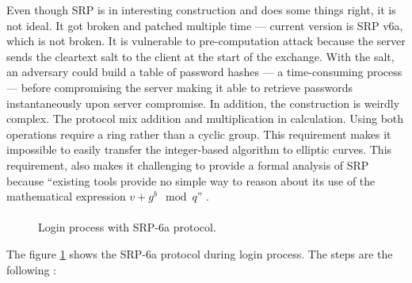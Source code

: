 ﻿\documentclass[../report.tex]{subfiles}
\begin{document}
Even though SRP is in interesting construction and does some things right, it is not ideal.
It got broken and patched multiple time --- current version is SRP v6a, which is not broken.
It is vulnerable to pre-computation attack because the server sends the cleartext salt to the client at the start of the exchange. With the salt, an adversary could build a table of password hashes --- a time-consuming process --- before compromising the server making it able to retrieve passwords instantaneously upon server compromise.
In addition, the construction is weirdly complex.
The protocol mix addition and multiplication in calculation. Using both operations require a ring rather than a cyclic group. This requirement makes it impossible to easily transfer the integer-based algorithm to elliptic curves. %
This requirement, also makes it challenging to provide a formal analysis of SRP because 
``existing tools provide no simple way to reason about its use of the mathematical expression $v+g^b \mod{q}$'' \cite{SRP_Formal_Analysis}. %


\paragraph{}


\begin{figure}[h]
 \centering
 \setlength{\fboxsep}{10pt}
 \setlength{\fboxrule}{1pt}
 \caption{Login process with SRP-6a protocol.}
 \label{fig:SRP}
\end{figure}


The figure \ref{fig:SRP} shows the SRP-6a protocol during login process.
The steps are the following :
\end{document}
